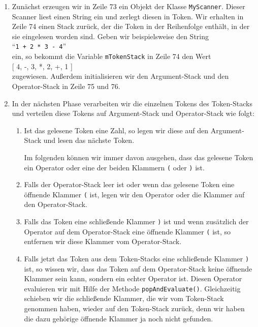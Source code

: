 \begin{enumerate}
\item Zun\"achst erzeugen wir in Zeile 73 ein Objekt der Klasse \texttt{MyScanner}.
      Dieser Scanner liest einen String ein und zerlegt diesen in Token.
      Wir erhalten in Zeile 74 einen Stack zur\"uck, der die Token in der Reihenfolge
      enth\"alt, in der sie eingelesen worden sind.  Geben wir beispielsweise den String \\[0.1cm]
      \hspace*{1.3cm} ``\texttt{1 + 2 * 3 - 4}'' \\[0.1cm]
      ein, so bekommt die Variable \texttt{mTokenStack} in Zeile 74 den Wert \\[0.1cm]
      \hspace*{1.3cm} [ 4, -, 3, *, 2, +, 1 ]
      \\[0.1cm]
      zugewiesen.
      Au{\ss}erdem initialisieren wir den Argument-Stack und den Operator-Stack in Zeile 75 und 76.      
\item In der n\"achsten Phase verarbeiten wir die einzelnen Tokens des Token-Stacks
      und verteilen
      diese Tokens auf Argument-Stack und Operator-Stack wie folgt:
      \begin{enumerate}
      \item Ist das gelesene Token eine Zahl, so legen wir diese auf den Argument-Stack
            und lesen das n\"achste Token.
        
            Im folgenden k\"onnen wir immer davon ausgehen, dass das gelesene Token ein
            Operator oder eine der beiden Klammern \texttt{(} oder
            \texttt{)} ist. 
      \item Falls der Operator-Stack leer ist oder wenn das gelesene Token eine \"offnende Klammer
            \texttt{(} ist, legen wir den Operator oder die Klammer auf den Operator-Stack.
      \item Falls das  Token eine schlie{\ss}ende Klammer \texttt{)} ist und wenn zus\"atzlich
            der Operator auf dem Operator-Stack eine \"offnende Klammer \texttt{(} ist, so 
            entfernen wir diese Klammer vom Operator-Stack.
      \item Falls jetzt das Token aus dem Token-Stacks eine schlie{\ss}ende Klammer
            \texttt{)} 
            ist, so wissen wir, dass das Token auf dem Operator-Stack keine \"offnende
            Klammer sein kann, sondern ein echter Operator ist. 
            Diesen Operator evaluieren wir mit Hilfe der Methode \texttt{popAndEvaluate()}.
            Gleichzeitig schieben wir die schlie{\ss}ende Klammer, die wir vom Token-Stack genommen
            haben, wieder auf den Token-Stack zur\"uck, denn wir haben die dazu geh\"orige
            \"offnende Klammer ja noch nicht gefunden.


\end{enumerate}
\end{enumerate}
